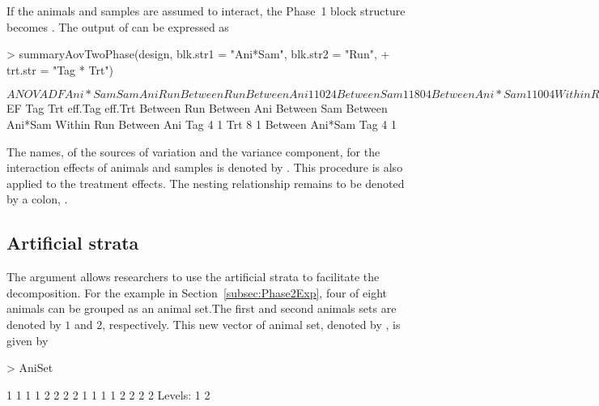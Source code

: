 \documentclass[article]{jss}
\begin{document}
If the animals and samples are assumed to interact, the Phase~1 block structure becomes . The output of  can be expressed as
\begin{CodeChunk}
\begin{CodeInput}
> summaryAovTwoPhase(design, blk.str1 = "Ani*Sam", blk.str2 = "Run", 
+ trt.str = "Tag * Trt")                                     
\end{CodeInput}
\begin{CodeOutput}
$ANOVA
                   DF Ani*Sam Sam Ani Run
Between Run                              
   Between Ani     1  1       0   2   4  
   Between Sam     1  1       8   0   4  
   Between Ani*Sam 1  1       0   0   4  
Within Run                               
   Between Ani                           
      Tag          1  1       0   2   0  
      Trt          1  1       0   2   0  
      Residual     4  1       0   2   0  
   Between Ani*Sam                       
      Tag          2  1       0   0   0  
      Residual     4  1       0   0   0  

$EF
                   Tag Trt eff.Tag eff.Trt
Between Run                               
   Between Ani                            
   Between Sam                            
   Between Ani*Sam                        
Within Run                                
   Between Ani                            
      Tag          4       1              
      Trt              8           1      
   Between Ani*Sam                        
      Tag          4       1                  
\end{CodeOutput}
\end{CodeChunk}
The names, of the sources of variation and the variance component, for the interaction effects of animals and samples is denoted by . This procedure is also applied to the treatment effects. The nesting relationship remains to be denoted by a colon, \code{:}.

\subsection{Artificial strata}
The  argument allows researchers to use the artificial strata to facilitate the decomposition. For the example in Section~\ref{subsec:Phase2Exp}, four of eight animals can be grouped as an animal set.The first and second animals sets are denoted by $1$ and $2$, respectively. This new vector of animal set, denoted by , is given by
\begin{CodeChunk}
\begin{CodeInput}
> AniSet
\end{CodeInput}
\begin{CodeOutput}
 [1] 1 1 1 1 2 2 2 2 1 1 1 1 2 2 2 2
Levels: 1 2
\end{CodeOutput}
\end{CodeChunk}
\end{document}

